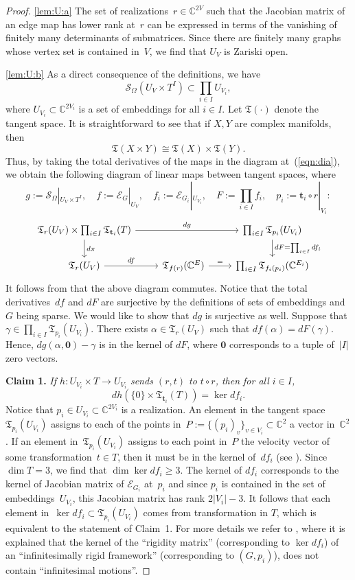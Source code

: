 \documentclass[12pt]{article}
\theoremstyle{definition}
\newcommand{\EQN}[1]{(\ref{eqn:#1})}
\newcommand{\st}{such that }
\renewcommand{\c}{\colon}
\newcommand{\C}{{\mathbb{C}}}
\newcommand{\cE}{\mathcal{E}}
\newcommand{\cS}{\mathcal{S}}
\newcommand{\bt}{\mathbf{t}}
\newcommand{\fT}{\mathfrak{T}}
\newcommand{\zv}{\mathbf{0}}
\begin{document}
\begin{proof}
\ref{lem:U:a}
The set of realizations~$r\in \C^{2V}$
\st the Jacobian matrix of an edge map has lower rank at~$r$
can be expressed in terms of the vanishing of finitely many determinants of submatrices.
Since there are finitely many graphs whose vertex set is contained in~$V$,
we find that $U_V$ is Zariski open.

\ref{lem:U:b}
As a direct consequence of the definitions, we have
\[
\cS_\Omega(U_V\times T^I)\subset \prod_{i\in I} U_{V_i},
\]
where $U_{V_i}\subset\C^{2V_i}$ is a set of embeddings for all $i\in I$.
Let $\fT(\cdot)$ denote the tangent space. It is straightforward to see that if $X,Y$ are complex manifolds, then
\[
\fT(X\times Y)\cong \fT(X)\times\fT(Y).
\]
Thus, by taking the total derivatives of the maps in the diagram at~\EQN{dia},
we obtain the following diagram of linear maps between tangent spaces,
where
\[
g:=\cS_\Omega|_{U_V\times T^I},\quad
f:=\cE_G|_{U_V},\quad
f_i:=\cE_{G_i}|_{U_{V_i}},\quad
F:=\prod_{i\in I}f_i,\quad
p_i:=\bt_i\circ r|_{V_i}:
\]
\[
\begin{tikzcd}
\fT_r(U_V)\times\prod_{i\in I}\fT_{\bt_i}(T)\arrow[d, "d\pi"]\arrow[rr, "dg"] & & \prod_{i\in I}\fT_{p_i}(U_{V_i})\arrow[d,"dF=\prod_{i\in I} df_i"]\\
\fT_r(U_V)\arrow[r,"df"] & \arrow[r,"="]\fT_{f(r)}(\C^E) & \prod_{i\in I}\fT_{f_i(p_i)}(\C^{E_i})
\end{tikzcd}
\]
It follows from  that the above diagram commutes.
Notice that the total derivatives~$df$ and $dF$ are surjective
by the definitions of sets of embeddings and $G$ being sparse.
We would like to show that $dg$ is surjective as well.
Suppose that $\gamma\in \prod_{i\in I}\fT_{p_i}(U_{V_i})$.
There exists $\alpha\in \fT_r(U_V)$ \st $df(\alpha)=dF(\gamma)$.
Hence, $dg(\alpha,\zv)-\gamma$ is in the kernel of $dF$,
where $\zv$ corresponds to a tuple of~$|I|$ zero vectors.

{\bf Claim 1.}
{\it If $h\c U_{V_i}\times T\to U_{V_i}$ sends $(r,t)$ to $t\circ r$, then for all $i\in I$,}
\[
dh(\{0\}\times \fT_{\bt_i}(T))=\ker df_i.
\]
Notice that $p_i\in U_{V_i}\subset \C^{2V_i}$ is a realization.
An element in the tangent space~$\fT_{p_i}(U_{V_i})$ assigns to each of the points in~$P:=\{(p_i)_v\}_{v\in V_i}\subset \C^2$
a vector in~$\C^2$.
If an element in~$\fT_{p_i}(U_{V_i})$ assigns to each point in~$P$ the velocity vector of some transformation~$t\in T$,
then it must be in the kernel of~$df_i$ (see \citep[]{2019hb}).
Since $\dim T=3$, we find that $\dim \ker df_i\geq 3$.
The kernel of $df_i$ corresponds to the kernel of Jacobian matrix of $\cE_{G_i}$ at~$p_i$
and since $p_i$ is contained in the set of embeddings~$U_{V_i}$,
this Jacobian matrix has rank $2|V_i|-3$.
It follows that each element in~$\ker df_i\subset \fT_{p_i}(U_{V_i})$ comes from
transformation in $T$,
which is equivalent to the statement of Claim~1.
For more details we refer to \citep[.2 and Theorem~18.4]{2019hb},
where it is explained that the kernel of the ``rigidity matrix'' (corresponding to $\ker df_i$)
of an ``infinitesimally rigid framework'' (corresponding to $(G,p_i)$),
does not contain ``infinitesimal motions''.


\end{proof}
\end{document}
